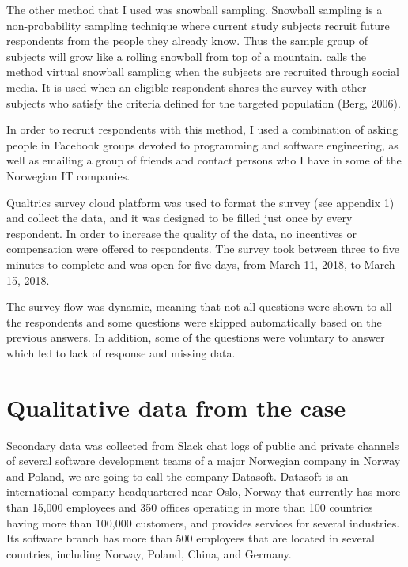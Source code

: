 The other method that I used was snowball sampling. Snowball sampling is a non-probability sampling technique where current study subjects recruit future respondents from the people they already know. Thus the sample group of subjects will grow like a rolling snowball from top of a mountain. \citet{Baltar2012} calls the method virtual snowball sampling when the subjects are recruited through social media. It is used when an eligible respondent shares the survey with other subjects who satisfy the criteria defined for the targeted population (Berg, 2006).

In order to recruit respondents with this method, I used a combination of asking people in Facebook groups devoted to programming and software engineering, as well as emailing a group of friends and contact persons who I have in some of the Norwegian IT companies.

Qualtrics survey cloud platform was used to format the survey (see appendix 1) and collect the data, and it was designed to be filled just once by every respondent. In order to increase the quality of the data, no incentives or compensation were offered to respondents.  The survey took between three to five minutes to complete and was open for five days, from March 11, 2018, to March 15, 2018.

The survey flow was dynamic, meaning that not all questions were shown to all the respondents and some questions were skipped automatically based on the previous answers. In addition, some of the questions were voluntary to answer which led to lack of response and missing data.

\section{Qualitative data from the case}

Secondary data was collected from Slack chat logs of public and private channels of several software development teams of a major Norwegian company in Norway and Poland, we are going to call the company Datasoft.
Datasoft is an international company headquartered near Oslo, Norway that currently has more than 15,000 employees and 350 offices operating in more than 100 countries having more than 100,000 customers, and provides services for several industries. Its software branch has more than 500 employees that are located in several countries, including Norway, Poland, China, and Germany.

